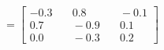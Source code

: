\documentclass[preview]{standalone}
\begin{document}
\begin{align*}
=\begin{bmatrix} -0.3 & \quad 0.8 & \quad -0.1 \\ 0.7 & \quad -0.9 & \quad 0.1 \\ 0.0 & \quad -0.3 & \quad 0.2 \end{bmatrix}
\end{align*}
\end{document}
